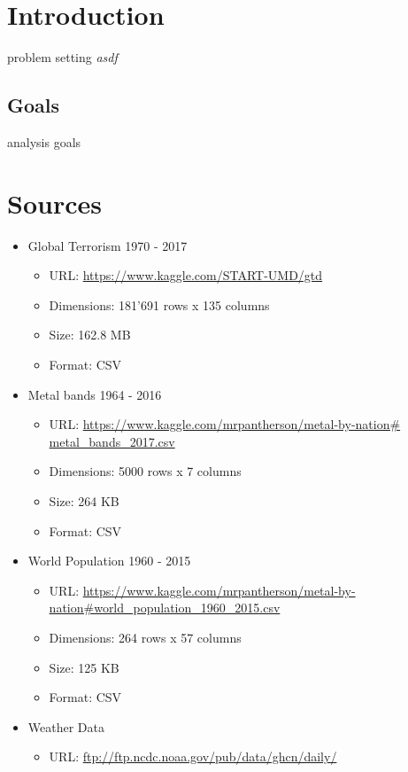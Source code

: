 
\section{Introduction}


problem setting
\emph{asdf}




\subsection{Goals}
analysis goals




\section{Sources}
\begin{itemize}
	\item Global Terrorism 1970 - 2017
	\begin{itemize}
		\item URL: \url{https://www.kaggle.com/START-UMD/gtd}
		\item Dimensions: 181'691 rows x 135 columns
		\item Size: 162.8 MB
		\item Format: CSV
	\end{itemize}
	\item Metal bands 1964 - 2016
	\begin{itemize}
		\item URL: \url{https://www.kaggle.com/mrpantherson/metal-by-nation# metal_bands_2017.csv}
		\item Dimensions: 5000 rows x 7 columns
		\item Size: 264 KB
		\item Format: CSV
	\end{itemize}
	\item World Population 1960 - 2015
	\begin{itemize}
		\item URL: \url{https://www.kaggle.com/mrpantherson/metal-by-nation#world_population_1960_2015.csv}
		\item Dimensions: 264 rows x 57 columns
		\item Size: 125 KB
		\item Format: CSV
	\end{itemize}
	\item Weather Data
	\begin{itemize}
		\item URL: \url{ftp://ftp.ncdc.noaa.gov/pub/data/ghcn/daily/}

\end{itemize}
\end{itemize}
